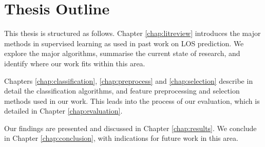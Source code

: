 \section{Thesis Outline}
This thesis is structured as follows. Chapter \ref{chap:litreview} introduces
the major methods in supervised learning as used in past work on LOS
prediction. We explore the major algorithms, summarise the current state of
research, and identify where our work fits within this area.

Chapters \ref{chap:classification}, \ref{chap:preprocess} and
\ref{chap:selection} describe in detail the classification algorithms, and
feature preprocessing and selection methods used in our work. This leads into
the process of our evaluation, which is detailed in Chapter
\ref{chap:evaluation}.

Our findings are presented and discussed in Chapter \ref{chap:results}.
We conclude in Chapter \ref{chap:conclusion}, with indications for future
work in this area.
